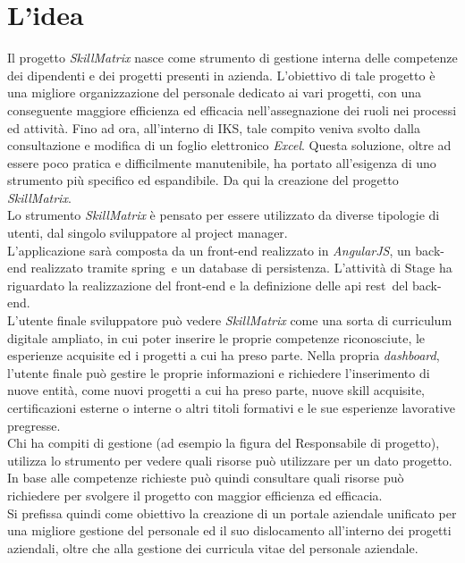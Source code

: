 
\section{L'idea}

Il progetto \emph{SkillMatrix} nasce come strumento di gestione interna delle competenze dei dipendenti e dei progetti presenti in azienda. L'obiettivo di tale progetto è una migliore organizzazione del personale dedicato ai vari progetti, con una conseguente maggiore efficienza ed efficacia nell'assegnazione dei ruoli nei processi ed attività. Fino ad ora, all'interno di IKS, tale compito veniva svolto dalla consultazione e modifica di un foglio elettronico \emph{Excel}. Questa soluzione, oltre ad essere poco pratica e difficilmente manutenibile, ha portato all'esigenza di uno strumento più specifico ed espandibile. Da qui la creazione del progetto \emph{SkillMatrix}.\\
Lo strumento \emph{SkillMatrix} è pensato per essere utilizzato da diverse tipologie di utenti, dal singolo sviluppatore al project manager.\\
L'applicazione sarà composta da un \gls{front-end} realizzato in \emph{AngularJS}, un \gls{back-end} realizzato tramite \gls{spring}\glsfirstoccur\  e un database di persistenza. L'attività di Stage ha riguardato la realizzazione del \gls{front-end} e la definizione delle \gls{api} \gls{rest}\glsfirstoccur\  del \gls{back-end}.\\
L'utente finale sviluppatore può vedere \emph{SkillMatrix} come una sorta di curriculum digitale ampliato, in cui poter inserire le proprie competenze riconosciute, le esperienze acquisite ed i progetti a cui ha preso parte. Nella propria \emph{dashboard}, l'utente finale può gestire le proprie informazioni e richiedere l'inserimento di nuove entità, come nuovi progetti a cui ha preso parte, nuove skill acquisite, certificazioni esterne o interne o altri titoli formativi e le sue esperienze lavorative pregresse.\\ 
Chi ha compiti di gestione (ad esempio la figura del Responsabile di progetto), utilizza lo strumento per vedere quali risorse può utilizzare per un dato progetto. In base alle competenze richieste può quindi consultare quali risorse può richiedere per svolgere il progetto con maggior efficienza ed efficacia.\\ 
Si prefissa quindi come obiettivo la creazione di un portale aziendale unificato per una migliore gestione del personale ed il suo dislocamento all’interno dei progetti aziendali, oltre che alla gestione dei curricula vitae del personale aziendale.\\

